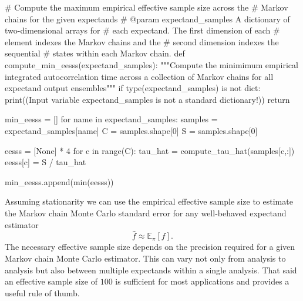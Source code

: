 \documentclass[
  letterpaper,
  DIV=11,
  numbers=noendperiod]{scrartcl}
\newenvironment{Shaded}{\begin{snugshade}}{\end{snugshade}}
\newcommand{\BuiltInTok}[1]{\textcolor[rgb]{0.00,0.23,0.31}{#1}}
\newcommand{\CommentTok}[1]{\textcolor[rgb]{0.37,0.37,0.37}{#1}}
\newcommand{\ControlFlowTok}[1]{\textcolor[rgb]{0.00,0.23,0.31}{#1}}
\newcommand{\DecValTok}[1]{\textcolor[rgb]{0.68,0.00,0.00}{#1}}
\newcommand{\KeywordTok}[1]{\textcolor[rgb]{0.00,0.23,0.31}{#1}}
\newcommand{\NormalTok}[1]{\textcolor[rgb]{0.00,0.23,0.31}{#1}}
\newcommand{\OperatorTok}[1]{\textcolor[rgb]{0.37,0.37,0.37}{#1}}
\newcommand{\StringTok}[1]{\textcolor[rgb]{0.13,0.47,0.30}{#1}}
\newcommand{\VariableTok}[1]{\textcolor[rgb]{0.07,0.07,0.07}{#1}}
\begin{document}
\begin{Shaded}
\begin{Highlighting}[]

\CommentTok{\# Compute the maximum empirical effective sample size across the }
\CommentTok{\# Markov chains for the given expectands}
\CommentTok{\# @param expectand\_samples A dictionary of two{-}dimensional arrays for}
\CommentTok{\#                          each expectand.  The first dimension of each}
\CommentTok{\#                          element indexes the Markov chains and the }
\CommentTok{\#                          second dimension indexes the sequential }
\CommentTok{\#                          states within each Markov chain.}
\KeywordTok{def}\NormalTok{ compute\_min\_eesss(expectand\_samples):}
  \CommentTok{"""Compute the minimimum empirical integrated autocorrelation time}
\CommentTok{     across a collection of Markov chains for all expectand output}
\CommentTok{     ensembles"""}
  \ControlFlowTok{if} \BuiltInTok{type}\NormalTok{(expectand\_samples) }\KeywordTok{is} \KeywordTok{not} \BuiltInTok{dict}\NormalTok{:}
    \BuiltInTok{print}\NormalTok{((}\StringTok{\textquotesingle{}Input variable \textasciigrave{}expectand\_samples\textasciigrave{} \textquotesingle{}}
           \StringTok{\textquotesingle{}is not a standard dictionary!\textquotesingle{}}\NormalTok{))}
    \ControlFlowTok{return}
      
\NormalTok{  min\_eesss }\OperatorTok{=}\NormalTok{ []}
  \ControlFlowTok{for}\NormalTok{ name }\KeywordTok{in}\NormalTok{ expectand\_samples:}
\NormalTok{    samples }\OperatorTok{=}\NormalTok{ expectand\_samples[name]}
\NormalTok{    C }\OperatorTok{=}\NormalTok{ samples.shape[}\DecValTok{0}\NormalTok{]}
\NormalTok{    S }\OperatorTok{=}\NormalTok{ samples.shape[}\DecValTok{0}\NormalTok{]}
    
\NormalTok{    eesss }\OperatorTok{=}\NormalTok{ [}\VariableTok{None}\NormalTok{] }\OperatorTok{*} \DecValTok{4}
    \ControlFlowTok{for}\NormalTok{ c }\KeywordTok{in} \BuiltInTok{range}\NormalTok{(C):}
\NormalTok{      tau\_hat }\OperatorTok{=}\NormalTok{ compute\_tau\_hat(samples[c,:])}
\NormalTok{      eesss[c] }\OperatorTok{=}\NormalTok{ S }\OperatorTok{/}\NormalTok{ tau\_hat}
    
\NormalTok{    min\_eesss.append(}\BuiltInTok{min}\NormalTok{(eesss))}
  
\end{Highlighting}
\end{Shaded}

Assuming stationarity we can use the empirical effective sample size to
estimate the Markov chain Monte Carlo standard error for any
well-behaved expectand estimator \[
\hat{f} \approx \mathbb{E}_{\pi}[f].
\] The necessary effective sample size depends on the precision required
for a given Markov chain Monte Carlo estimator. This can vary not only
from analysis to analysis but also between multiple expectands within a
single analysis. That said an effective sample size of \(100\) is
sufficient for most applications and provides a useful rule of thumb.
\end{document}
